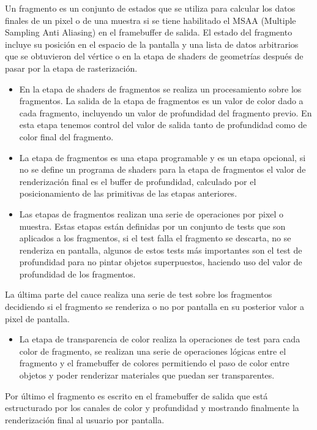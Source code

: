 \documentclass[a4paper, 17pt]{book}
\begin{document}
Un fragmento es un conjunto de estados que se utiliza para calcular los datos finales de un pixel o de una muestra si se tiene
habilitado el MSAA (Multiple Sampling Anti Aliasing) en el framebuffer de salida. El estado del fragmento incluye su posición
en el espacio de la pantalla y una lista de datos arbitrarios que se obtuvieron del vértice o en la etapa de shaders de geometrías
después de pasar por la etapa de rasterización.

\begin{itemize}
  \item En la etapa de shaders de fragmentos se realiza un procesamiento sobre los fragmentos. La salida de la etapa de fragmentos es
  un valor de color dado a cada fragmento, incluyendo un valor de profundidad del fragmento previo.  En esta etapa tenemos control
  del valor de salida tanto de profundidad como de color final del fragmento. 
  
  \item La etapa de fragmentos es una etapa programable y es un etapa opcional, si no se define un programa de shaders para la etapa
  de fragmentos el valor de renderización final es el buffer de profundidad, calculado por el posicionamiento de las primitivas de
  las etapas anteriores.

  \item Las etapas de fragmentos realizan una serie de operaciones por pixel o muestra. Estas etapas están definidas por un conjunto
  de tests que son aplicados a los fragmentos, si el test falla el fragmento se descarta, no se renderiza en pantalla, algunos de
  estos tests más importantes son el test de profundidad para no pintar objetos superpuestos, haciendo uso del valor de profundidad
  de los fragmentos.
\end{itemize}

La última parte del cauce realiza una serie de test sobre los fragmentos decidiendo si el fragmento se renderiza o no por pantalla en
su posterior valor a pixel de pantalla.

\begin{itemize}
  \item  La etapa de transparencia de color realiza la operaciones de test para cada color de fragmento, se realizan una serie de
  operaciones lógicas entre el fragmento y el framebuffer de colores permitiendo el paso de color entre objetos y poder renderizar
  materiales que puedan ser transparentes.
\end{itemize}

Por último el fragmento es escrito en el framebuffer de salida que está estructurado por los canales de color y profundidad y mostrando
finalmente la renderización final al usuario por pantalla.
\end{document}
